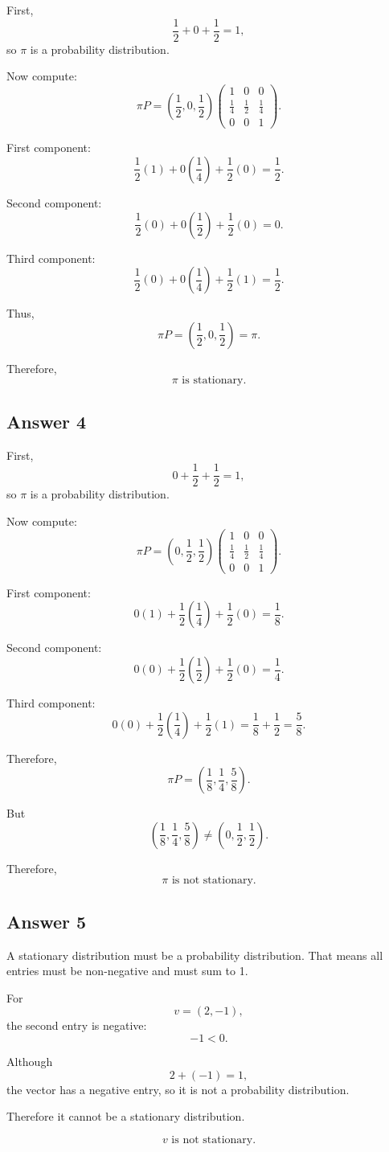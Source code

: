 \documentclass[12pt,a4paper]{article}
\theoremstyle{notestyle}
\begin{document}
First,
\[
\frac12+0+\frac12=1,
\]
so $\pi$ is a probability distribution.

Now compute:
\[
\pi P
=
\left(\frac12,0,\frac12\right)
\begin{pmatrix}
1 & 0 & 0\\
\frac14 & \frac12 & \frac14\\
0 & 0 & 1
\end{pmatrix}.
\]

First component:
\[
\frac12(1)+0\left(\frac14\right)+\frac12(0)=\frac12.
\]

Second component:
\[
\frac12(0)+0\left(\frac12\right)+\frac12(0)=0.
\]

Third component:
\[
\frac12(0)+0\left(\frac14\right)+\frac12(1)=\frac12.
\]

Thus,
\[
\pi P=\left(\frac12,0,\frac12\right)=\pi.
\]

Therefore,
\[
\boxed{\pi\text{ is stationary.}}
\]

\subsection*{Answer 4}

First,
\[
0+\frac12+\frac12=1,
\]
so $\pi$ is a probability distribution.

Now compute:
\[
\pi P
=
\left(0,\frac12,\frac12\right)
\begin{pmatrix}
1 & 0 & 0\\
\frac14 & \frac12 & \frac14\\
0 & 0 & 1
\end{pmatrix}.
\]

First component:
\[
0(1)+\frac12\left(\frac14\right)+\frac12(0)=\frac18.
\]

Second component:
\[
0(0)+\frac12\left(\frac12\right)+\frac12(0)=\frac14.
\]

Third component:
\[
0(0)+\frac12\left(\frac14\right)+\frac12(1)=\frac18+\frac12=\frac58.
\]

Therefore,
\[
\pi P=\left(\frac18,\frac14,\frac58\right).
\]

But
\[
\left(\frac18,\frac14,\frac58\right)
\neq
\left(0,\frac12,\frac12\right).
\]

Therefore,
\[
\boxed{\pi\text{ is not stationary.}}
\]

\subsection*{Answer 5}

A stationary distribution must be a probability distribution. That means all entries must be non-negative and must sum to 1.

For
\[
v=(2,-1),
\]
the second entry is negative:
\[
-1<0.
\]

Although
\[
2+(-1)=1,
\]
the vector has a negative entry, so it is not a probability distribution.

Therefore it cannot be a stationary distribution.

\[
\boxed{v\text{ is not stationary.}}
\]
\end{document}
